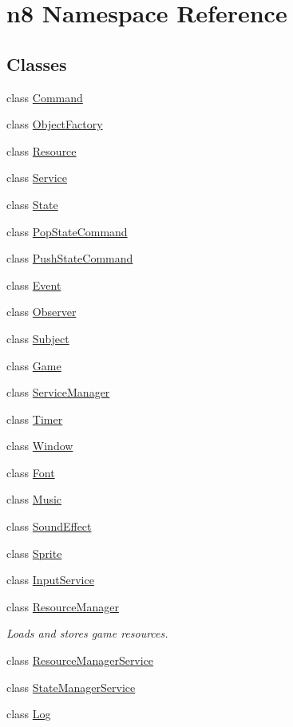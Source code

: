 \hypertarget{namespacen8}{\section{n8 Namespace Reference}
\label{namespacen8}
}
\subsection*{Classes}
\begin{DoxyCompactItemize}
\item 
class \hyperlink{classn8_1_1_command}{Command}
\item 
class \hyperlink{classn8_1_1_object_factory}{Object\-Factory}
\item 
class \hyperlink{classn8_1_1_resource}{Resource}
\item 
class \hyperlink{classn8_1_1_service}{Service}
\item 
class \hyperlink{classn8_1_1_state}{State}
\item 
class \hyperlink{classn8_1_1_pop_state_command}{Pop\-State\-Command}
\item 
class \hyperlink{classn8_1_1_push_state_command}{Push\-State\-Command}
\item 
class \hyperlink{classn8_1_1_event}{Event}
\item 
class \hyperlink{classn8_1_1_observer}{Observer}
\item 
class \hyperlink{classn8_1_1_subject}{Subject}
\item 
class \hyperlink{classn8_1_1_game}{Game}
\item 
class \hyperlink{classn8_1_1_service_manager}{Service\-Manager}
\item 
class \hyperlink{classn8_1_1_timer}{Timer}
\item 
class \hyperlink{classn8_1_1_window}{Window}
\item 
class \hyperlink{classn8_1_1_font}{Font}
\item 
class \hyperlink{classn8_1_1_music}{Music}
\item 
class \hyperlink{classn8_1_1_sound_effect}{Sound\-Effect}
\item 
class \hyperlink{classn8_1_1_sprite}{Sprite}
\item 
class \hyperlink{classn8_1_1_input_service}{Input\-Service}
\item 
class \hyperlink{classn8_1_1_resource_manager}{Resource\-Manager}
\begin{DoxyCompactList}\small\item\em Loads and stores game resources. \end{DoxyCompactList}\item 
class \hyperlink{classn8_1_1_resource_manager_service}{Resource\-Manager\-Service}
\item 
class \hyperlink{classn8_1_1_state_manager_service}{State\-Manager\-Service}
\item 
class \hyperlink{classn8_1_1_log}{Log}
\end{DoxyCompactItemize}
